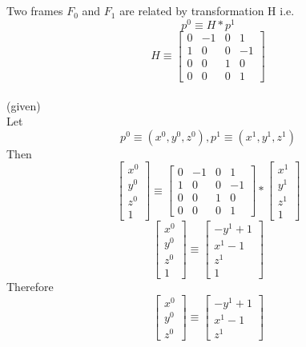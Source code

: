 \documentclass[12pt]{article}
\newcommand{\given}{{\\ \color{blue} \hspace*{\fill}(given)} \\}
\begin{document}
\section{}

\pagebreak

\section{}
Two frames $F_0$ and $F_1$ are related by transformation H i.e.
\[
  p^0 \equiv H * p^1
\]
\[
  H \equiv
  \begin{bmatrix} 0 & -1 & 0 & 1 \\ 1 & 0 & 0 & -1 \\ 0 & 0 & 1 & 0 \\ 0 & 0 & 0 & 1 \end{bmatrix}
\]
\given
Let
\[
  p^0 \equiv (x^0, y^0, z^0), p^1 \equiv (x^1, y^1, z^1)
\]
Then
\[
  \begin{bmatrix} x^0 \\ y^0 \\ z^0 \\ 1\end{bmatrix} \equiv
  \begin{bmatrix} 0 & -1 & 0 & 1 \\ 1 & 0 & 0 & -1 \\ 0 & 0 & 1 & 0 \\ 0 & 0 & 0 & 1 \end{bmatrix}
  *
  \begin{bmatrix} x^1 \\ y^1 \\ z^1 \\ 1\end{bmatrix}
\]
\[
  \begin{bmatrix} x^0 \\ y^0 \\ z^0 \\ 1\end{bmatrix} \equiv
  \begin{bmatrix} -y^1 + 1 \\ x^1 - 1 \\ z^1 \\ 1\end{bmatrix}
\]
Therefore
\[
  \begin{bmatrix} x^0 \\ y^0 \\ z^0\end{bmatrix} \equiv
  \begin{bmatrix} -y^1 + 1 \\ x^1 - 1 \\ z^1\end{bmatrix}
\]
\end{document}
